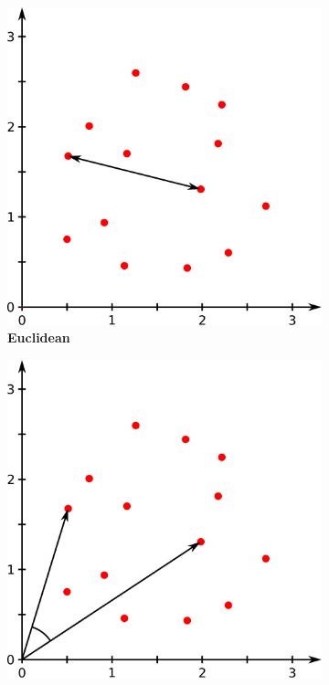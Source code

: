 \begin{figure}
    \caption[A figure]{\textbf{A figure.} A figure.}
    \label{fig:1.0.2}
    
    \begin{adjustbox}{minipage=\dimexpr{}\fboxrule,fbox}
        \begin{subfigure}[b]{0.45\textwidth}
            \includegraphics[width=\textwidth]{Extra_Graphics/Euclidean.pdf}
            \caption[Euclidean]{\textbf{Euclidean}}
            \label{fig:1.0.2a}
        \end{subfigure}
        \hfill
        \begin{subfigure}[b]{0.45\textwidth}
            \includegraphics[width=\textwidth]{Extra_Graphics/Cosinus.pdf}

\end{subfigure}
\end{adjustbox}
\end{figure}
